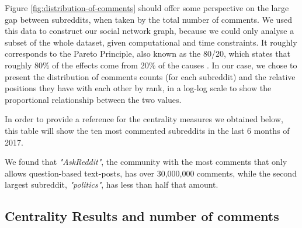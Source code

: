 \documentclass[bsc,frontabs,twoside,singlespacing,parskip,deptreport]{infthesis}
\begin{document}
Figure \ref{fig:distribution-of-comments} should offer some perspective on the large gap between subreddits, when taken by the total number of comments. We used this data to construct our social network graph, because we could only analyse a subset of the whole dataset, given computational and time constraints. It roughly corresponds to the Pareto Principle, also known as the 80/20, which states that roughly 80\% of the effects come from 20\% of the causes \cite{pareto}. In our case, we chose to present the distribution of comments counts (for each subreddit) and the relative positions they have with each other by rank, in a log-log scale to show the proportional relationship between the two values.

In order to provide a reference for the centrality measures we obtained below, this table will show the ten most commented subreddits in the last 6 months of 2017. 

\vfill

\begin{table}[!h]
\centering
{}
\caption{Top 10 subreddits with the highest number of comments between July and December 2017 (inclusive)}
\label{top-commented}
\end{table}

We found that \textit{"AskReddit"}, the community with the most comments that only allows question-based text-posts, has over 30,000,000 comments, while the second largest subreddit, \textit{"politics"}, has less than half that amount.

\subsection{Centrality Results and number of comments}
\end{document}
